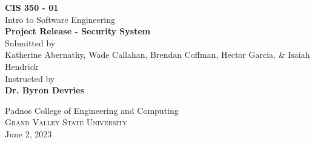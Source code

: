\begin{titlepage}

\begin{center}

\textup{\small {\bf CIS 350 - 01} \\ Intro to Software Engineering }\\[0.2in]

\Large \textbf {Project Release - Security System}\\[0.5in]

\normalsize Submitted by \\
Katherine Abernathy, Wade Callahan, Brendan Coffman, Hector Garcia, \& Isaiah Hendrick\\

\vspace{.3in}
Instructed by\\
{\textbf{Dr. Byron Devries}}\\[0.2in]

\vfill

\Large{Padnos College of Engineering and Computing}\\
\normalsize
\textsc{Grand Valley State University}\\
June 2, 2023

\end{center}

\end{titlepage}
